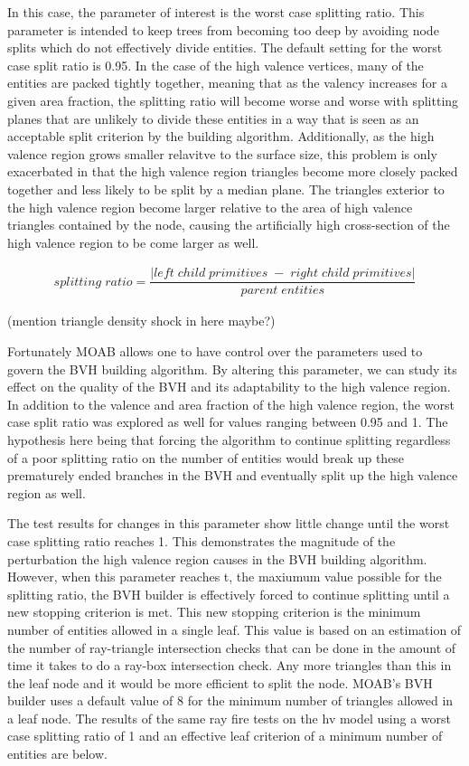 \documentclass[10pt, a4paper]{article}
\begin{document}
In this case, the parameter of interest is the worst case splitting ratio. This parameter is intended to keep trees from becoming too deep by avoiding node splits which do not effectively divide entities. The default setting for the worst case split ratio is 0.95. In the case of the high valence vertices, many of the entities are packed tightly together, meaning that as the valency increases for a given area fraction, the splitting ratio will become worse and worse with splitting planes that are unlikely to divide these entities in a way that is seen as an acceptable split criterion by the building algorithm. Additionally, as the high valence region grows smaller relavitve to the surface size, this problem is only exacerbated in that the high valence region triangles become more closely packed together and less likely to be split by a median plane. The triangles exterior to the high valence region become larger relative to the area of high valence triangles contained by the node, causing the artificially high cross-section of the high valence region to be come larger as well.


  \begin{align*}
  splitting\;ratio  = \dfrac{|left\; child\; primitives\; -\; right\; child\; primitives|}{parent\; entities}
  \end{align*}

(mention triangle density shock in here maybe?)

  Fortunately MOAB allows one to have control over the parameters used to govern the BVH building algorithm. By altering this parameter, we can study its effect on the quality of the BVH and its adaptability to the high valence region. In addition to the valence and area fraction of the high valence region, the worst case split ratio was explored as well for values ranging between 0.95 and 1. The hypothesis here being that forcing the algorithm to continue splitting regardless of a poor splitting ratio on the number of entities would break up these prematurely ended branches in the BVH and eventually split up the high valence region as well.


  The test results for changes in this parameter show little change until the worst case splitting ratio reaches 1. This demonstrates the magnitude of the  perturbation the high valence region causes in the BVH building algorithm. However, when this parameter reaches t, the maxiumum value possible for the splitting ratio, the BVH builder is effectively forced to continue splitting until a new stopping criterion is met. This new stopping criterion is the minimum number of entities allowed in a single leaf. This value is based on an estimation of the number of ray-triangle intersection checks that can be done in the amount of time it takes to do a ray-box intersection check. Any more triangles than this in the leaf node and it would be more efficient to split the node. MOAB's BVH builder uses a default value of 8 for the minimum number of triangles allowed in a leaf node. The results of the same ray fire tests on the hv model using a worst case splitting ratio of 1 and an effective leaf criterion of a minimum number of entities are below.
\end{document}
